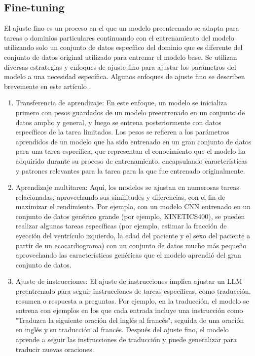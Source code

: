 \documentclass[12pt,twocolumn]{article}
\begin{document}
\subsection{Fine-tuning}
El ajuste fino es un proceso en el que un modelo preentrenado se adapta para tareas o dominios particulares continuando con el entrenamiento del modelo utilizando solo un conjunto de datos específico del dominio que es diferente del conjunto de datos original utilizado para entrenar el modelo base. 
Se utilizan diversas estrategias y enfoques de ajuste fino para ajustar los parámetros del modelo a una necesidad específica. Algunos enfoques de ajuste fino se describen brevemente en este artículo \parencite{touvron2023llama}.
\begin{enumerate}
\item Transferencia de aprendizaje: En este enfoque, un modelo se inicializa primero con pesos guardados de un modelo preentrenado en un conjunto de datos amplio y general, y luego se entrena posteriormente con datos específicos de la tarea limitados. 
Los pesos se refieren a los parámetros aprendidos de un modelo que ha sido entrenado en un gran conjunto de datos para una tarea específica, que representan el conocimiento que el modelo ha adquirido durante su proceso de entrenamiento, encapsulando características y patrones relevantes para la tarea para la que fue entrenado originalmente.
\item Aprendizaje multitarea: Aquí, los modelos se ajustan en numerosas tareas relacionadas, aprovechando sus similitudes y diferencias, con el fin de maximizar el rendimiento. 
Por ejemplo, con un modelo CNN entrenado en un conjunto de datos genérico grande (por ejemplo, KINETICS400), se pueden realizar algunas tareas específicas (por ejemplo, estimar la fracción de eyección del ventrículo izquierdo, la edad del paciente y el sexo del paciente a partir de un ecocardiograma) con un conjunto de datos mucho más pequeño aprovechando las características genéricas que el modelo aprendió del gran conjunto de datos.
\item Ajuste de instrucciones: El ajuste de instrucciones implica ajustar un LLM preentrenado para seguir instrucciones de tareas específicas, como traducción, resumen o respuesta a preguntas. 
Por ejemplo, en la traducción, el modelo se entrena con ejemplos en los que cada entrada incluye una instrucción como "Traduzca la siguiente oración del inglés al francés", seguida de una oración en inglés y su traducción al francés. 
Después del ajuste fino, el modelo aprende a seguir las instrucciones de traducción y puede generalizar para traducir nuevas oraciones.
\end{enumerate}
\end{document}

